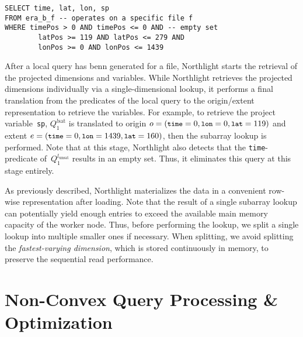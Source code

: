 \documentclass[conference]{IEEEtran}
\newcommand{\system}{Northlight}
\newcommand{\smalltt}[1]{{\texttt{\small #1}}}
\begin{document}
\noindent 
\begin{minipage}{\linewidth}
\begin{lstlisting}[style=sql, caption={Locally rewritten query~$Q_1^{l_{\text{unsat}}}$, which will be executed on a file that \textbf{does not satisfy} the \smalltt{time}-predicate.}, label={listing:q1_rewritten2_noqual}]
SELECT time, lat, lon, sp
FROM era_b_f -- operates on a specific file f
WHERE timePos > 0 AND timePos <= 0 AND -- empty set
        latPos >= 119 AND latPos <= 279 AND
        lonPos >= 0 AND lonPos <= 1439
\end{lstlisting}
\end{minipage}

After a local query has benn generated for a file, \system{} starts the retrieval of the projected dimensions and variables. While \system{} retrieves the projected dimensions individually via a single-dimensional lookup, 
it performs a final translation from the predicates of the local query to the origin/extent representation to retrieve the variables. For example, to retrieve the project variable~\smalltt{sp}, $Q_1^{l{\text{sat}}}$ is translated to origin
$o=(\smalltt{time}=0, \smalltt{lon}=0, \smalltt{lat}=119)$
and extent
$e=(\smalltt{time}=0, \smalltt{lon}=1439, \smalltt{lat}=160)$, then the subarray lookup is performed. Note that at this stage, \system{} also detects that the \smalltt{time}-predicate of~$Q_1^{l_{\text{unsat}}}$ results in an empty set. Thus, it eliminates this query at this stage entirely.

As previously described, \system{} materializes the data in a convenient row-wise representation after loading. 
Note that the result of a single subarray lookup can potentially yield enough entries to exceed the available main memory capacity of the worker node. Thus, before performing the lookup, we split a single lookup into multiple smaller ones if necessary. When splitting, we avoid splitting the \textit{fastest-varying dimension}, which is stored continuously in memory, to preserve the sequential read performance.

\section{Non-Convex Query Processing \& Optimization}
\label{ssec:non_convex_query_processing}
\end{document}
